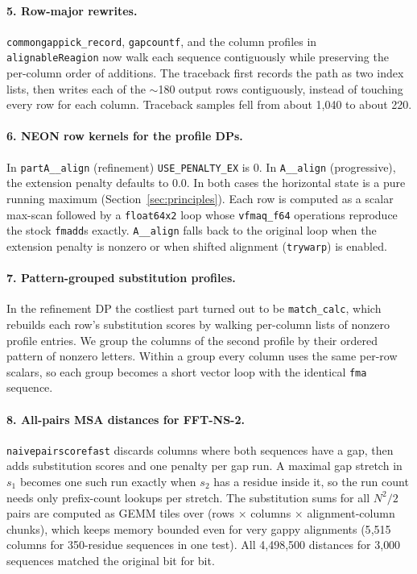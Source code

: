 \documentclass[11pt]{article}
\newcommand{\code}[1]{\texttt{#1}}
\begin{document}
\paragraph{5. Row-major rewrites.} \code{commongappick\_record}, \code{gapcountf}, and the
column profiles in \code{alignableReagion} now walk each sequence contiguously while
preserving the per-column order of additions. The traceback first records the path as two
index lists, then writes each of the $\sim$180 output rows contiguously, instead of
touching every row for each column. Traceback samples fell from about 1{,}040 to about 220.

\paragraph{6. NEON row kernels for the profile DPs.} In \code{partA\_\_align} (refinement)
\code{USE\_PENALTY\_EX} is 0. In \code{A\_\_align} (progressive), the extension penalty
defaults to $0.0$. In both cases the horizontal state is a pure running maximum
(Section~\ref{sec:principles}). Each row is computed as a scalar max-scan followed by a
\code{float64x2} loop whose \code{vfmaq\_f64} operations reproduce the stock \code{fmadd}s
exactly. \code{A\_\_align} falls back to the original loop when the extension penalty is
nonzero or when shifted alignment (\code{trywarp}) is enabled.

\paragraph{7. Pattern-grouped substitution profiles.} In the refinement DP the costliest
part turned out to be \code{match\_calc}, which rebuilds each row's substitution scores by
walking per-column lists of nonzero profile entries. We group the columns of the second
profile by their ordered pattern of nonzero letters. Within a group every column uses the
same per-row scalars, so each group becomes a short vector loop with the identical
\code{fma} sequence.

\paragraph{8. All-pairs MSA distances for FFT-NS-2.} \code{naivepairscorefast} discards
columns where both sequences have a gap, then adds substitution scores and one penalty per
gap run. A maximal gap stretch in $s_1$ becomes one such run exactly when $s_2$ has a
residue inside it, so the run count needs only prefix-count lookups per stretch. The
substitution sums for all $N^2/2$ pairs are computed as GEMM tiles over
(rows $\times$ columns $\times$ alignment-column chunks), which keeps memory bounded even for
very gappy alignments (5{,}515 columns for 350-residue sequences in one test). All
4{,}498{,}500 distances for 3{,}000 sequences matched the original bit for bit.
\end{document}
